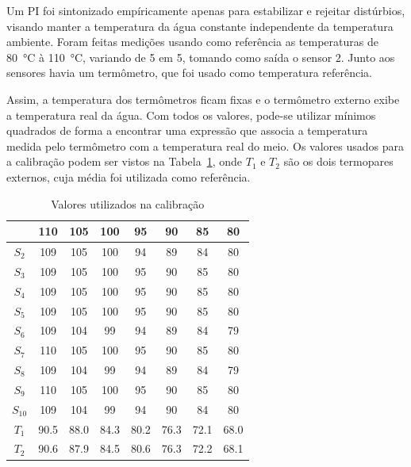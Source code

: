 Um PI foi sintonizado empíricamente apenas para estabilizar e rejeitar
distúrbios, visando manter a temperatura da água constante independente da
temperatura ambiente. Foram feitas medições usando como referência as
temperaturas de \SI{80}{\degreeCelsius} à \SI{110}{\degreeCelsius}, variando de
5 em 5, tomando como saída o sensor \(2\). Junto aos sensores havia um
termômetro, que foi usado como temperatura referência.

Assim, a temperatura dos termômetros ficam fixas e o termômetro externo exibe a
temperatura real da água. Com todos os valores, pode-se utilizar mínimos
quadrados de forma a encontrar uma expressão que associa a temperatura medida
pelo termômetro com a temperatura real do meio. Os valores usados para a
calibração podem ser vistos na Tabela~\ref{tbl:calib-coefs}, onde \(T_1\) e
\(T_2\) são os dois termopares externos, cuja média foi utilizada como
referência.

\begin{table}[ht!]
	\centering
	\caption{Valores utilizados na calibração}%
	\label{tbl:calib-coefs}
	\begin{tabular}{@{}c|ccccccc@{}}
		\toprule
		           & 110  & 105  & 100  & 95   & 90   & 85   & 80   \\ \midrule
		\(S_2\)    & 109  & 105  & 100  & 94   & 89   & 84   & 80   \\
		\(S_3\)    & 109  & 105  & 100  & 95   & 90   & 85   & 80   \\
		\(S_4\)    & 109  & 105  & 100  & 95   & 90   & 85   & 80   \\
		\(S_5\)    & 109  & 105  & 100  & 95   & 90   & 85   & 80   \\
		\(S_6\)    & 109  & 104  & 99   & 94   & 89   & 84   & 79   \\
		\(S_7\)    & 110  & 105  & 100  & 95   & 90   & 85   & 80   \\
		\(S_8\)    & 109  & 104  & 99   & 94   & 89   & 84   & 79   \\
		\(S_9\)    & 110  & 105  & 100  & 95   & 90   & 85   & 80   \\
		\(S_{10}\) & 109  & 104  & 99   & 94   & 90   & 84   & 80   \\
		\(T_1\)    & 90.5 & 88.0 & 84.3 & 80.2 & 76.3 & 72.1 & 68.0 \\
		\(T_2\)    & 90.6 & 87.9 & 84.5 & 80.6 & 76.3 & 72.2 & 68.1 \\ \bottomrule
	\end{tabular}
\end{table}

